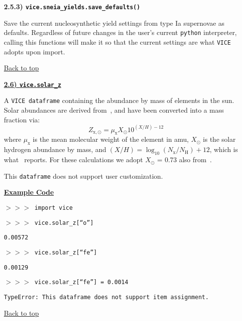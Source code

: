 \documentclass{report}
\begin{document}
\null\par\noindent %
\hypertarget{df:sneia_yields:save_defaults}{
	\textbf{2.5.3) \texttt{vice.sneia\_yields.save\_defaults()}}
}
\par\noindent 
Save the current nucleosynthetic yield settings from type Ia supernovae as 
defaults. Regardless of future changes in the user's current \texttt{python} 
interpreter, calling this functions will make it so that the current settings 
are what \texttt{VICE} adopts upon import. 

\vfill
\hyperlink{top}{Back to top}
\clearpage 

\newpage
\noindent 
\begin{center} 
\hypertarget{df:solar_z}{
	\underline{\LARGE
		\textbf{2.6) \texttt{vice.solar\_z}}
	}
}
\end{center}
\par\noindent 
A \texttt{VICE dataframe} containing the abundance by mass of elements in the 
sun. Solar abundances are derived from~\citet{Asplund2009}, and have been 
converted into a mass fraction via: 
\begin{equation}
Z_{\text{x},\odot} = \mu_\text{x}X_\odot 10^{(X/H) - 12}
\end{equation}
where $\mu_\text{x}$ is the mean molecular weight of the element in amu, 
$X_\odot$ is the solar hydrogen abundance by mass, and $(X/H) = \log_{10}(
N_\text{x}/N_\text{H}) + 12$, which is what~\citet{Asplund2009} reports. For 
these calculations we adopt $X_\odot$ = 0.73 also from~\citet{Asplund2009}. 
\par
This \texttt{dataframe} does not support user customization. 
\par\null\par\noindent 
\underline{\textbf{Example Code}} 
\par\noindent 
\texttt{$>>>$ import vice} \par\noindent 
\texttt{$>>>$ vice.solar\_z[``o'']} \par\noindent 
\texttt{0.00572} \par\noindent 
\texttt{$>>>$ vice.solar\_z[``fe'']} \par\noindent 
\texttt{0.00129} \par\noindent 
\texttt{$>>>$ vice.solar\_z[``fe''] = 0.0014} \par\noindent 
\texttt{TypeError: This dataframe does not support item assignment.} 
\par\noindent 

\vfill 
\hyperlink{top}{Back to top}
\clearpage 
\end{document}
